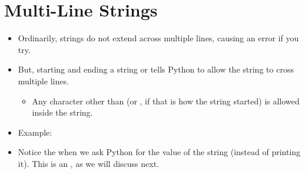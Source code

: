\documentclass[letterpaper,10pt,english]{sphinxmanual}
\begin{document}
\section{Multi-Line Strings}
\label{\detokenize{lecture_notes/lec03_strings:multi-line-strings}}\begin{itemize}
\item {} 
Ordinarily, strings do not extend across multiple lines, causing an
error if you try.

\item {} 
But, starting and ending a string  or  tells Python to
allow the string to cross multiple lines.
\begin{itemize}
\item {} 
Any character other than  (or , if that is how the
string started) is allowed inside the string.

\end{itemize}

\item {} 
Example:

\begin{sphinxVerbatim}[commandchars=\\\{\}]
  
\end{sphinxVerbatim}

\item {} 
Notice the  when we ask Python for the value of the string
(instead of printing it). This is an , as we will
discuss next.

\end{itemize}
\end{document}
